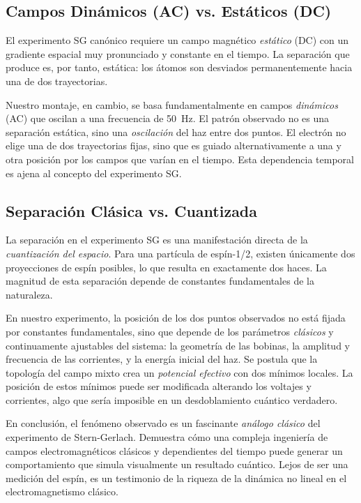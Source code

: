\subsection{Campos Dinámicos (AC) vs. Estáticos (DC)}

El experimento SG canónico requiere un campo magnético \emph{estático}
(DC) con un gradiente espacial muy pronunciado y constante en el tiempo.
La separación que produce es, por tanto, estática: los átomos son
desviados permanentemente hacia una de dos trayectorias.

Nuestro montaje, en cambio, se basa fundamentalmente en campos
\emph{dinámicos} (AC) que oscilan a una frecuencia de \qty{50}{\hertz}.
El patrón observado no es una separación estática, sino una \emph{oscilación}
del haz entre dos puntos. El electrón no elige una de dos trayectorias
fijas, sino que es guiado alternativamente a una y otra posición por los
campos que varían en el tiempo. Esta dependencia temporal es ajena al
concepto del experimento SG.

\subsection{Separación Clásica vs. Cuantizada}

La separación en el experimento SG es una manifestación directa de la
\emph{cuantización del espacio}. Para una partícula de espín-1/2, existen
únicamente dos proyecciones de espín posibles, lo que resulta en
exactamente dos haces. La magnitud de esta separación depende de
constantes fundamentales de la naturaleza.

En nuestro experimento, la posición de los dos puntos observados no está
fijada por constantes fundamentales, sino que depende de los parámetros
\emph{clásicos} y continuamente ajustables del sistema: la geometría de
las bobinas, la amplitud y frecuencia de las corrientes, y la energía
inicial del haz. Se postula que la topología del campo mixto crea un
\emph{potencial efectivo} con dos mínimos locales. La posición de estos
mínimos puede ser modificada alterando los voltajes y corrientes, algo
que sería imposible en un desdoblamiento cuántico verdadero.

En conclusión, el fenómeno observado es un fascinante \emph{análogo clásico}
del experimento de Stern-Gerlach. Demuestra cómo una compleja ingeniería
de campos electromagnéticos clásicos y dependientes del tiempo puede
generar un comportamiento que simula visualmente un resultado cuántico. Lejos
de ser una medición del espín, es un testimonio de la riqueza de la dinámica
no lineal en el electromagnetismo clásico.
